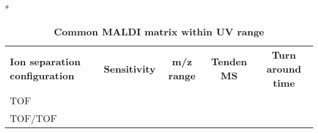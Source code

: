 \begin{table}{*}
\caption{\textbf{Common MALDI matrix within UV range}}
\label{tab:matrix}

\centering 
\scriptsize

\begin{tabular}{|l|c|c|c|c|}
    \hline 
    \textbf{Ion separation configuration} & \textbf{Sensitivity} & \textbf{m/z range} & \textbf{Tenden MS} & \textbf{Turn around time} \\
    TOF & \\
    TOF/TOF \\
    
    \hline \hline 
\end{tabular}
\end{table}